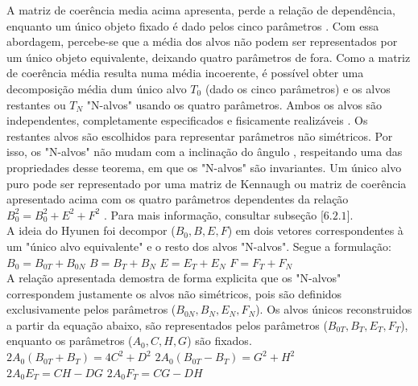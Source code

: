 \documentclass[a4paper,12pt]{article}
\begin{document}
A matriz de coerência media acima apresenta, perde a relação de dependência, enquanto um único objeto fixado é dado pelos cinco parâmetros \cite{jong:2009}. Com essa abordagem, percebe-se que a média dos alvos não podem ser representados por um único objeto equivalente, deixando quatro parâmetros de fora. Como a matriz de coerência média resulta numa média incoerente, é possível obter uma decomposição média dum único alvo $T_{0}$ (dado os cinco parâmetros) e os alvos restantes ou $T_{N}$ "N-alvos" usando os quatro parâmetros. Ambos os alvos são independentes, completamente especificados e fisicamente realizáveis \cite{jong:2009}. Os restantes alvos são escolhidos para representar parâmetros não simétricos. Por isso, os "N-alvos" não mudam com a inclinação do ângulo \cite{jong:2009}, respeitando uma das propriedades desse teorema, em que os "N-alvos" são invariantes. Um único alvo puro pode ser representado por uma matriz de Kennaugh ou matriz de coerência apresentado acima com os quatro parâmetros dependentes da relação $B^2_{0}=B^2_{0}+E^2+F^2$ \cite{jong:2009}. Para mais informação, consultar \cite{jong:2009} subseção [$6.2.1$].\\

A ideia do Hyunen foi decompor ($B_{0}, B, E, F$) em dois vetores correspondentes à um "único alvo equivalente" e o resto dos alvos "N-alvos". Segue a formulação:\\

$B_{0}=B_{0T} + B_{0N}$ \hspace{0.5cm} $B = B_{T}+B_{N}$ \hspace{0.5cm}
$E=E_{T} + E_{N}$ \hspace{0.5cm} $F = F_{T}+F_{N}$\\

A relação apresentada demostra de forma explicita que os "N-alvos"  correspondem justamente os alvos não simétricos, pois são definidos exclusivamente pelos parâmetros ($B_{0N}, B_{N}, E_{N}, F_{N}$). Os alvos únicos reconstruidos a partir da equação abaixo, são representados pelos parâmetros ($B_{0T}, B_{T}, E_{T}, F_{T}$), enquanto os parâmetros ($A_{0} , C, H, G$) são fixados. \\

$2A_{0} (B_{0T} + B_{T} ) = 4 C^2 + D^2$ \hspace{0.5cm} $2A_{0} (B_{0T}-B_{T}) = G^2 + H^2$ \\

$2A_{0} E_{T} = CH-DG$ \hspace{0.5cm} $2A_{0} F_{T} = CG-DH$ \\
\end{document}
